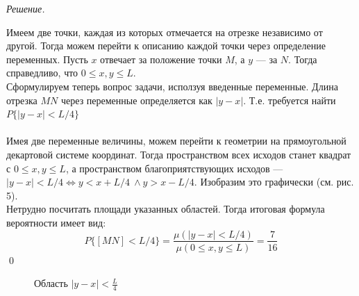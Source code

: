 \documentclass[12pt,a4paper]{article}
\theoremstyle{definition}
\theoremstyle{definition}
\theoremstyle{remark}
\theoremstyle{corollary}
\theoremstyle{bolditalic}
\newenvironment{solution}{
    \vspace{0.5em}
    \noindent\textit{Решение.}
}{\qed\vspace{1em}}
\begin{document}
\begin{solution}
    Имеем две точки, каждая из которых отмечается на отрезке независимо от другой. Тогда можем перейти к описанию каждой точки через определение переменных. Пусть $x$ отвечает за положение точки $M$, а $y$ --- за $N$. Тогда справедливо, что $0 \le x, y \le L$.\\
    Сформулируем теперь вопрос задачи, исползуя введенные переменные. Длина отрезка $MN$ через переменные определяется как $|y-x|$. Т.е. требуется найти $P\{|y-x|<L/4\}$\\\\
    Имея две переменные величины, можем перейти к геометрии на прямоугольной декартовой системе координат. Тогда пространством всех исходов станет квадрат с $0 \le x, y \le L$, а пространством благоприятствующих исходов --- $|y-x|<L/4 \iff y<x +L/4 \ \land y > x - L/4$. Изобразим это графически (см. рис. 5).\\
    Нетрудно посчитать площади указанных областей. Тогда итоговая  формула вероятности имеет вид:
    \[
    P\{[MN] < L/4\} = \frac{\mu(|y-x|<L/4)}{\mu(0 \le x, y \le L)} = \frac{7}{16}
    \]
\end{solution}

\begin{figure}[h]
\newcommand{\Lval}{8} %
\centering
{}
\caption{Область $\left| y - x \right| < \frac{L}{4}$}
\end{figure}
\end{document}
